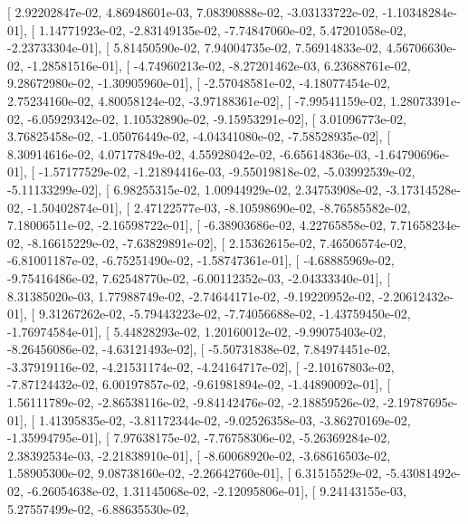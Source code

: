 \documentclass{article}
\begin{document}
       [  2.92202847e-02,   4.86948601e-03,   7.08390888e-02,
         -3.03133722e-02,  -1.10348284e-01],
       [  1.14771923e-02,  -2.83149135e-02,  -7.74847060e-02,
          5.47201058e-02,  -2.23733304e-01],
       [  5.81450590e-02,   7.94004735e-02,   7.56914833e-02,
          4.56706630e-02,  -1.28581516e-01],
       [ -4.74960213e-02,  -8.27201462e-03,   6.23688761e-02,
          9.28672980e-02,  -1.30905960e-01],
       [ -2.57048581e-02,  -4.18077454e-02,   2.75234160e-02,
          4.80058124e-02,  -3.97188361e-02],
       [ -7.99541159e-02,   1.28073391e-02,  -6.05929342e-02,
          1.10532890e-02,  -9.15953291e-02],
       [  3.01096773e-02,   3.76825458e-02,  -1.05076449e-02,
         -4.04341080e-02,  -7.58528935e-02],
       [  8.30914616e-02,   4.07177849e-02,   4.55928042e-02,
         -6.65614836e-03,  -1.64790696e-01],
       [ -1.57177529e-02,  -1.21894416e-03,  -9.55019818e-02,
         -5.03992539e-02,  -5.11133299e-02],
       [  6.98255315e-02,   1.00944929e-02,   2.34753908e-02,
         -3.17314528e-02,  -1.50402874e-01],
       [  2.47122577e-03,  -8.10598690e-02,  -8.76585582e-02,
          7.18006511e-02,  -2.16598722e-01],
       [ -6.38903686e-02,   4.22765858e-02,   7.71658234e-02,
         -8.16615229e-02,  -7.63829891e-02],
       [  2.15362615e-02,   7.46506574e-02,  -6.81001187e-02,
         -6.75251490e-02,  -1.58747361e-01],
       [ -4.68885969e-02,  -9.75416486e-02,   7.62548770e-02,
         -6.00112352e-03,  -2.04333340e-01],
       [  8.31385020e-03,   1.77988749e-02,  -2.74644171e-02,
         -9.19220952e-02,  -2.20612432e-01],
       [  9.31267262e-02,  -5.79443223e-02,  -7.74056688e-02,
         -1.43759450e-02,  -1.76974584e-01],
       [  5.44828293e-02,   1.20160012e-02,  -9.99075403e-02,
         -8.26456086e-02,  -4.63121493e-02],
       [ -5.50731838e-02,   7.84974451e-02,  -3.37919116e-02,
         -4.21531174e-02,  -4.24164717e-02],
       [ -2.10167803e-02,  -7.87124432e-02,   6.00197857e-02,
         -9.61981894e-02,  -1.44890092e-01],
       [  1.56111789e-02,  -2.86538116e-02,  -9.84142476e-02,
         -2.18859526e-02,  -2.19787695e-01],
       [  1.41395835e-02,  -3.81172344e-02,  -9.02526358e-03,
         -3.86270169e-02,  -1.35994795e-01],
       [  7.97638175e-02,  -7.76758306e-02,  -5.26369284e-02,
          2.38392534e-03,  -2.21838910e-01],
       [ -8.60068920e-02,  -3.68616503e-02,   1.58905300e-02,
          9.08738160e-02,  -2.26642760e-01],
       [  6.31515529e-02,  -5.43081492e-02,  -6.26054638e-02,
          1.31145068e-02,  -2.12095806e-01],
       [  9.24143155e-03,   5.27557499e-02,  -6.88635530e-02,
\end{document}
